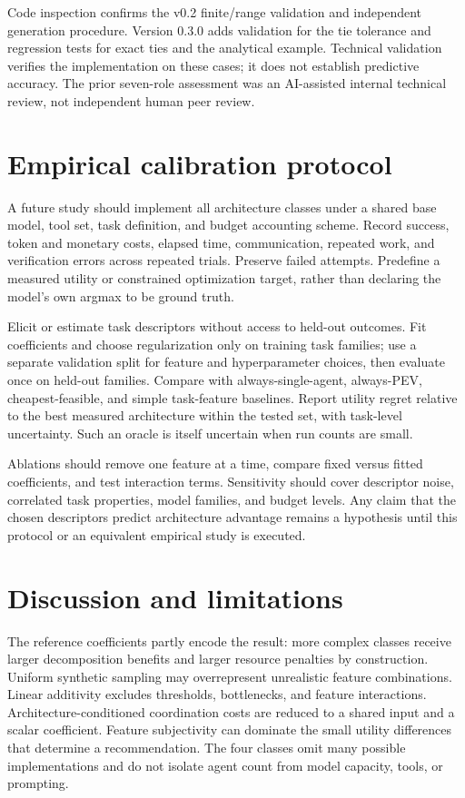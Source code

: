 \documentclass[11pt]{article}
\begin{document}
Code inspection confirms the v0.2 finite/range validation and independent generation procedure. Version 0.3.0 adds validation for the tie tolerance and regression tests for exact ties and the analytical example. Technical validation verifies the implementation on these cases; it does not establish predictive accuracy. The prior seven-role assessment was an AI-assisted internal technical review, not independent human peer review.

\section{Empirical calibration protocol}
A future study should implement all architecture classes under a shared base model, tool set, task definition, and budget accounting scheme. Record success, token and monetary costs, elapsed time, communication, repeated work, and verification errors across repeated trials. Preserve failed attempts. Predefine a measured utility or constrained optimization target, rather than declaring the model's own argmax to be ground truth.

Elicit or estimate task descriptors without access to held-out outcomes. Fit coefficients and choose regularization only on training task families; use a separate validation split for feature and hyperparameter choices, then evaluate once on held-out families. Compare with always-single-agent, always-PEV, cheapest-feasible, and simple task-feature baselines. Report utility regret relative to the best measured architecture within the tested set, with task-level uncertainty. Such an oracle is itself uncertain when run counts are small.

Ablations should remove one feature at a time, compare fixed versus fitted coefficients, and test interaction terms. Sensitivity should cover descriptor noise, correlated task properties, model families, and budget levels. Any claim that the chosen descriptors predict architecture advantage remains a hypothesis until this protocol or an equivalent empirical study is executed.

\section{Discussion and limitations}
The reference coefficients partly encode the result: more complex classes receive larger decomposition benefits and larger resource penalties by construction. Uniform synthetic sampling may overrepresent unrealistic feature combinations. Linear additivity excludes thresholds, bottlenecks, and feature interactions. Architecture-conditioned coordination costs are reduced to a shared input and a scalar coefficient. Feature subjectivity can dominate the small utility differences that determine a recommendation. The four classes omit many possible implementations and do not isolate agent count from model capacity, tools, or prompting.
\end{document}
